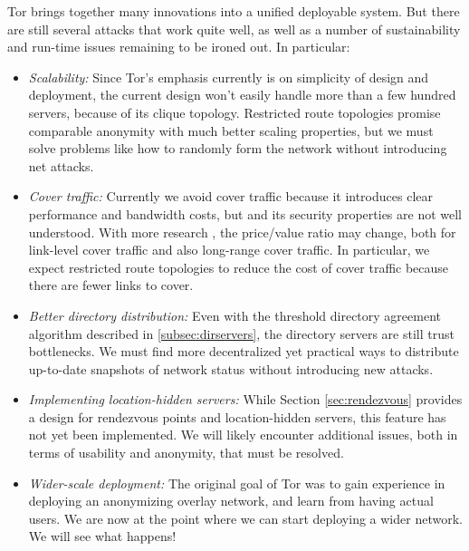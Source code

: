 \documentclass[times,10pt,twocolumn]{article}
\begin{document}
\label{sec:conclusion}


Tor brings together many innovations into
a unified deployable system. But there are still several attacks that
work quite well, as well as a number of sustainability and run-time
issues remaining to be ironed out. In particular:

\begin{itemize}
\item \emph{Scalability:} Since Tor's emphasis currently is on simplicity
of design and deployment, the current design won't easily handle more
than a few hundred servers, because of its clique topology. Restricted
route topologies \cite{danezis-pets03} promise comparable anonymity
with much better scaling properties, but we must solve problems like
how to randomly form the network without introducing net attacks.
\item \emph{Cover traffic:} Currently we avoid cover traffic because
it introduces clear performance and bandwidth costs, but and its
security properties are not well understood. With more research
\cite{SS03,defensive-dropping}, the price/value ratio may change, both for
link-level cover traffic and also long-range cover traffic. In particular,
we expect restricted route topologies to reduce the cost of cover traffic
because there are fewer links to cover.
\item \emph{Better directory distribution:} Even with the threshold
directory agreement algorithm described in \ref{subsec:dirservers},
the directory servers are still trust bottlenecks. We must find more
decentralized yet practical ways to distribute up-to-date snapshots of
network status without introducing new attacks.
\item \emph{Implementing location-hidden servers:} While Section
\ref{sec:rendezvous} provides a design for rendezvous points and
location-hidden servers, this feature has not yet been implemented.
We will likely encounter additional issues, both in terms of usability
and anonymity, that must be resolved.
\item \emph{Wider-scale deployment:} The original goal of Tor was to
gain experience in deploying an anonymizing overlay network, and learn
from having actual users. We are now at the point where we can start
deploying a wider network. We will see what happens!
\end{itemize}






\end{document}
